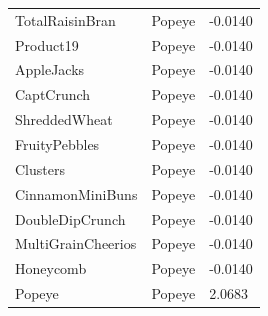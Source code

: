 \begin{table}[!htbp]
\begin{tabular}{lll}
TotalRaisinBran & Popeye & -0.0140
\\
Product19 & Popeye & -0.0140
\\
AppleJacks & Popeye & -0.0140
\\
CaptCrunch & Popeye & -0.0140
\\
ShreddedWheat & Popeye & -0.0140
\\
FruityPebbles & Popeye & -0.0140
\\
Clusters & Popeye & -0.0140
\\
CinnamonMiniBuns & Popeye & -0.0140
\\
DoubleDipCrunch & Popeye & -0.0140
\\
MultiGrainCheerios & Popeye & -0.0140
\\
Honeycomb & Popeye & -0.0140
\\
Popeye & Popeye & 2.0683
\\
\hline
\end{tabular}
\end{table}
